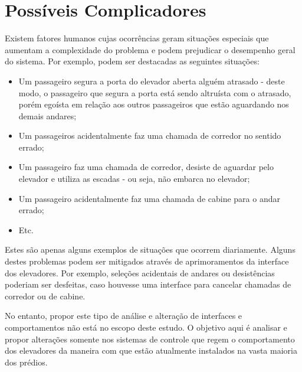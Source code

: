 \section{Possíveis Complicadores}

Existem fatores humanos cujas ocorrências geram situações especiais que aumentam
a complexidade do problema e podem prejudicar o desempenho geral do sistema. Por
exemplo, podem ser destacadas as seguintes situações:

\begin{itemize}
  \item Um passageiro segura a porta do elevador aberta alguém atrasado - deste
        modo, o passageiro que segura a porta está sendo altruísta com o
        atrasado, porém egoísta em relação aos outros passageiros que estão
        aguardando nos demais andares;
  \item Um passageiros acidentalmente faz uma chamada de corredor no sentido
        errado;
  \item Um passageiro faz uma chamada de corredor, desiste de aguardar pelo
        elevador e utiliza as escadas - ou seja, não embarca no elevador;
  \item Um passageiro acidentalmente faz uma chamada de cabine para o andar
        errado;
  \item Etc.
\end{itemize}

Estes são apenas alguns exemplos de situações que ocorrem diariamente. Alguns
destes problemas podem ser mitigados através de aprimoramentos da interface dos
elevadores. Por exemplo, seleções acidentais de andares ou desistências poderiam
ser desfeitas, caso houvesse uma interface para cancelar chamadas de corredor ou
de cabine.

No entanto, propor este tipo de análise e alteração de interfaces e
comportamentos não está no escopo deste estudo. O objetivo aqui é analisar e
propor alterações somente nos sistemas de controle que regem o comportamento dos
elevadores da maneira com que estão atualmente instalados na vasta maioria dos
prédios.